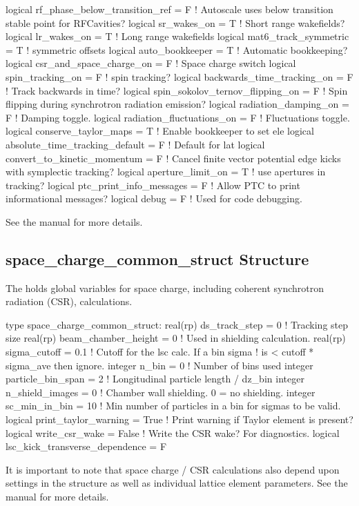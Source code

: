 {{{{{{{{\begin{example}
    logical rf_phase_below_transition_ref = F   ! Autoscale uses below transition stable point for RFCavities?
    logical sr_wakes_on = T                     ! Short range wakefields?
    logical lr_wakes_on = T                     ! Long range wakefields
    logical mat6_track_symmetric = T            ! symmetric offsets
    logical auto_bookkeeper = T                 ! Automatic bookkeeping?
    logical csr_and_space_charge_on = F         ! Space charge switch
    logical spin_tracking_on = F                ! spin tracking?
    logical backwards_time_tracking_on = F      ! Track backwards in time?
    logical spin_sokolov_ternov_flipping_on = F ! Spin flipping during synchrotron radiation emission?
    logical radiation_damping_on = F            ! Damping toggle.
    logical radiation_fluctuations_on = F       ! Fluctuations toggle.
    logical conserve_taylor_maps = T            ! Enable bookkeeper to set ele%
    logical absolute_time_tracking_default = F  ! Default for lat%
    logical convert_to_kinetic_momentum = F     ! Cancel finite vector potential edge kicks with symplectic tracking?
    logical aperture_limit_on = T               ! use apertures in tracking?
    logical ptc_print_info_messages = F         ! Allow PTC to print informational messages?
    logical debug = F                           ! Used for code debugging.
\end{example}
See the \bmad manual for more details.

\subsection{space\_charge\_common\_struct Structure}
\label{s:csr.param.struct} 

The  holds global variables for space charge, including coherent
synchrotron radiation (CSR), calculations. 
\begin{example}
  type space_charge_common_struct:
    real(rp) ds_track_step = 0          ! Tracking step size
    real(rp) beam_chamber_height = 0    ! Used in shielding calculation.
    real(rp) sigma_cutoff = 0.1         ! Cutoff for the lsc calc. If a bin sigma
                                        !  is < cutoff * sigma_ave then ignore.
    integer n_bin = 0                   ! Number of bins used
    integer particle_bin_span = 2       ! Longitudinal particle length / dz_bin
    integer n_shield_images = 0         ! Chamber wall shielding. 0 = no shielding.
    integer sc_min_in_bin = 10          ! Min number of particles in a bin for sigmas to be valid.
    logical print_taylor_warning = True ! Print warning if Taylor element is present?
    logical write_csr_wake = False      ! Write the CSR wake? For diagnostics.
    logical lsc_kick_transverse_dependence = F
\end{example}
It is important to note that space charge / CSR calculations also depend upon settings in the
 structure as well as individual lattice element parameters.  See the \bmad
manual for more details.

}}}}}}}}
